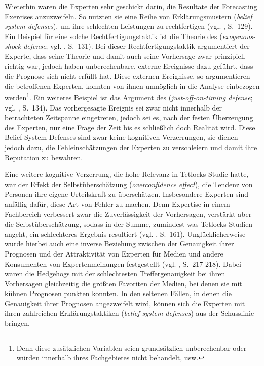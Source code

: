 Wieterhin waren die Experten sehr geschickt darin, die Resultate der Forecasting
Exercises anzuzweifeln. So nutzten sie eine Reihe von Erklärungsmustern
(\emph{belief system defenses}), um ihre schlechten Leistungen zu rechtfertigen
(vgl. \cite{Tetlock}, S.~129). Ein Beispiel für eine solche
Rechtfertigungstaktik ist die Theorie des \grqq{}
(\emph{exogenous-shock defense}; vgl. \cite{Tetlock}, S.~131). Bei dieser
Rechtfertigungstaktik argumentiert der Experte, dass seine Theorie und damit
auch seine Vorhersage zwar prinzipiell richtig war, jedoch haben unberechenbare,
externe Ereignisse dazu geführt, dass die Prognose sich nicht erfüllt hat. Diese
externen Ereignisse, so argumentieren die betroffenen Experten, konnten von
ihnen unmöglich in die Analyse einbezogen werden\footnote{
Denn diese zusätzlichen Variablen seien grundsätzlich unberechenbar oder würden
innerhalb ihres Fachgebietes nicht behandelt, usw.
}. Ein weiteres Beispiel ist das Argument des \grqq{}
(\emph{just-off-on-timing defense}; vgl. \cite{Tetlock}, S.~134). Das
vorhergesagte Ereignis sei zwar nicht innerhalb der betrachteten Zeitspanne 
eingetreten, jedoch sei es, nach der festen Überzeugung des Experten, nur eine
Frage der Zeit bis es schließlich doch Realität wird. Diese Belief System
Defenses sind zwar keine kognitiven Verzerrungen, sie dienen jedoch dazu, die
Fehleinschätzungen der Experten zu verschleiern und damit ihre Reputation zu
bewahren.

Eine weitere kognitive Verzerrung,
die hohe Relevanz in Tetlocks Studie hatte, war der Effekt der
Selbstüberschätzung (\emph{overconfidence effect}), die Tendenz von Personen ihre
eigene Urteilskraft zu überschätzen. Insbesondere Experten sind
anfällig dafür, diese Art von Fehler zu machen. Denn Expertise in einem
Fachbereich verbessert zwar die Zuverlässigkeit der Vorhersagen, verstärkt aber
die Selbstüberschätzung, sodass in der Summe, zumindest was Tetlocks Studien
angeht, ein schlechteres Ergebnis resultiert (vgl. \cite{Tetlock}, S.~161).
Unglücklicherweise wurde hierbei auch eine inverse Beziehung zwischen der
Genauigkeit ihrer Prognosen und der Attraktivität von Experten für Medien und andere 
Konsumenten von Expertenmeinungen festgestellt (vgl. \cite{Tetlock}, S.~217-218).
Dabei waren die Hedgehogs mit der schlechtesten Treffergenauigkeit bei ihren
Vorhersagen gleichzeitig die größten Favoriten der Medien, bei denen sie mit
kühnen Prognosen punkten konnten. In den seltenen Fällen, in denen die Genauigkeit
ihrer Prognosen angezweifelt wird, können sich die Experten mit ihren zahlreichen
Erklärungstaktiken (\emph{belief system defenses}) aus der Schusslinie bringen.

